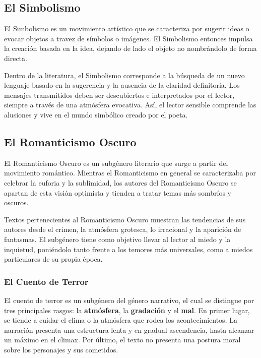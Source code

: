 \documentclass{article}
\begin{document}
\subsection{El Simbolismo}

El Simbolismo es un movimiento artístico que se caracteriza por sugerir ideas o evocar objetos a travez de símbolos o imágenes. El Simbolismo entonces impulsa la creación basada en la idea, dejando de lado el objeto no nombrándolo de forma directa.

Dentro de la literatura, el Simbolismo corresponde a la búsqueda de un nuevo lenguaje basado en la sugerencia y la ausencia de la claridad definitoria. Los mensajes transmitidos deben ser descubiertos e interpretados por el lector, siempre a través de una atmósfera evocativa. Así, el lector sensible comprende las alusiones y vive en el mundo simbólico creado por el poeta.

\subsection{El Romanticismo Oscuro}

El Romanticismo Oscuro es un subgénero literario que surge a partir del movimiento romántico. Mientras el Romanticismo en general se caracterizaba por celebrar la euforia y la sublimidad, los autores del Romanticismo Oscuro se apartan de esta visión optimista y tienden a tratar temas más sombríos y oscuros.

Textos pertenecientes al Romanticismo Oscuro muestran las tendencias de sus autores desde el crimen, la atmósfera grotesca, lo irracional y la aparición de fantasmas. El subgénero tiene como objetivo llevar al lector al miedo y la inquietud, poniéndolo tanto frente a los temores más universales, como a miedos particulares de su propia época.

\subsubsection*{El Cuento de Terror}

El cuento de terror es un subgénero del género narrativo, el cual se distingue por tres principales rasgos: la \textbf{atmósfera}, la \textbf{gradación} y el \textbf{mal}. En primer lugar, se tiende a cuidar el clima o la atmósfera que rodea los acontecimientos. La narración presenta una estructura lenta y en gradual ascendencia, hasta alcanzar un máximo en el climax. Por último, el texto no presenta una postura moral sobre los personajes y sus cometidos.
\end{document}
